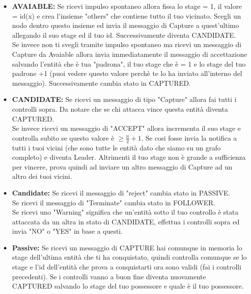 \begin{itemize}
    \item \textbf{AVAIABLE:} Se ricevi impulso spontaneo allora fissa lo stage = 1, il valore = id(x) e crea l'insieme "others" che contiene tutto il tuo vicinato. Scegli un nodo dentro questo insieme ed invia il messaggio di Capture a quest'ultimo allegando il suo stage ed il tuo id. Successivamente diventa CANDIDATE.\\
    Se invece non ti svegli tramite impulso spontaneo ma ricevi un messaggio di Capture da Avaiable allora invia immediatamente il messaggio di accettazione salvando l'entità che è tua "padrona", il tuo stage che è = 1 e lo stage del tuo padrone +1 (puoi vedere questo valore perchè te lo ha inviato all'interno del messaggio). Successivamente cambia stato in CAPTURED.
    \item \textbf{CANDIDATE:} Se ricevi un messaggio di tipo "Capture" allora fai tutti i controlli sopra. Da notare che se chi attacca vince questa entità diventa CAPTURED.\\
    Se invece ricevi un messaggio di "ACCEPT" allora incrementa il suo stage e controlla subito se questo valore è $\geq \frac{n}{2} +1$. Se cosi fosse invia la notifica a tutti i tuoi vicini (che sono tutte le entità dato che siamo su un grafo completo) e diventa Leader. 
    Altrimenti il tuo stage non è grande a sufficienza per vincere, prova quindi ad inviare un altro messaggio di Capture ad un altro dei tuoi vicini.
    \item \textbf{Candidate:} Se ricevi il messaggio di "reject" cambia stato in PASSIVE. \\ Se ricevi il messaggio di "Terminate" cambia stato in FOLLOWER.
    \\ Se ricevi uno "Warning" significa che un'entità sotto il tuo controllo è stata attaccata da un altra in stato di CANDIDATE, effettua i controlli sopra ed invia "NO" o "YES" in base a questi.
    \item \textbf{Passive:} Se ricevi un messaggio di CAPTURE hai comunque in memoria lo stage dell'ultima entità che ti ha conquistato, quindi controlla comunque se lo stage e l'id dell'entità che prova a conquistarti ora sono validi (fai i controlli precedenti). Se i controlli vanno a buon fine diventa nuovamente CAPTURED salvando lo stage del tuo possessore e quale è il tuo possessore.
\end{itemize}

